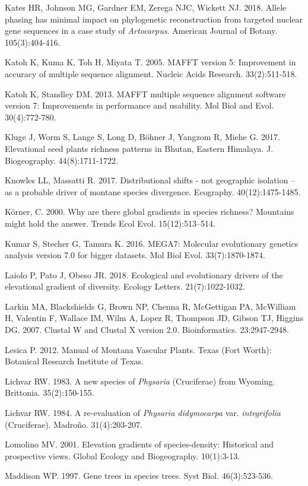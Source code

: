 Kates HR, Johnson MG, Gardner EM, Zerega NJC, Wickett NJ. 2018. Allele phasing has minimal impact on phylogenetic reconstruction from targeted nuclear gene sequences in a case study of \textit{Artocarpus}. American Journal of Botany. 105(3):404-416.

Katoh K, Kuma K, Toh H, Miyata T. 2005. MAFFT version 5: Improvement in accuracy of multiple sequence alignment. Nucleic Acids Research. 33(2):511-518.

Katoh K, Standley DM. 2013. MAFFT multiple sequence alignment software version 7: Improvements in performance and usability.  Mol Biol and Evol. 30(4):772-780.

Kluge J, Worm S, Lange S, Long D, Böhner J, Yangzom R, Miehe G. 2017. Elevational seed plants richness patterns in Bhutan, Eastern Himalaya. J. Biogeography. 44(8):1711-1722.

Knowles LL, Massatti R. 2017. Distributional shifts - not geographic isolation – as a probable driver of montane species divergence. Ecography. 40(12):1475-1485.

Körner, C. 2000. Why are there global gradients in species richness? Mountains might hold the answer. Trends Ecol Evol. 15(12):513–514.

Kumar S, Stecher G, Tamura K. 2016. MEGA7: Molecular evolutionary genetics analysis version 7.0 for bigger datasets. Mol Biol Evol. 33(7):1870-1874.

Laiolo P, Pato J, Obeso JR. 2018. Ecological and evolutionary drivers of the elevational gradient of diversity. Ecology Letters. 21(7):1022-1032.

Larkin MA, Blackshields G, Brown NP, Chenna R, McGettigan PA, McWilliam H, Valentin F, Wallace IM, Wilm A, Lopez R, Thompson JD, Gibson TJ, Higgins DG. 2007. Clustal W and Clustal X version 2.0. Bioinformatics. 23:2947-2948.

Lesica P. 2012. Manual of Montana Vascular Plants. Texas (Fort Worth): Botanical Research Institute of Texas.

Lichvar RW. 1983. A new species of \textit{Physaria} (Cruciferae) from Wyoming.  Brittonia. 35(2):150-155.

Lichvar RW. 1984. A re-evaluation of \textit{Physaria didymocarpa} var. \textit{integrifolia} (Cruciferae). Madroño. 31(4):203-207.

Lomolino MV. 2001. Elevation gradients of species-density: Historical and prospective views. Global Ecology and Biogeography. 10(1):3-13.

Maddison WP. 1997. Gene trees in species trees. Syst Biol. 46(3):523-536.

